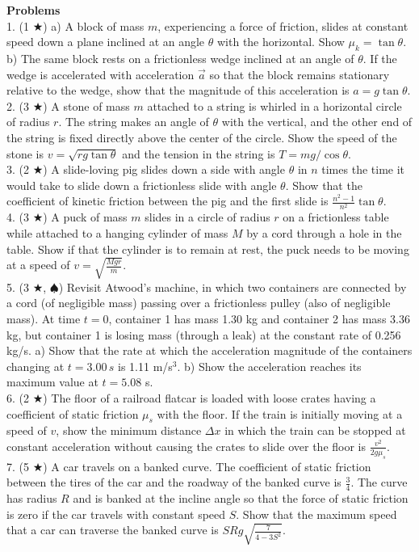 \noindent \textbf{Problems}\\
1. (1 $\bigstar$) a) A block of mass $m$, experiencing a force of friction, slides at constant speed down a plane inclined at an angle $\theta$ with the horizontal. Show $\mu_k = \tan\theta$. b) The same block rests on a frictionless wedge inclined at an angle of $\theta$. If the wedge is accelerated with acceleration $\vec a$ so that the block remains stationary relative to the wedge, show that the magnitude of this acceleration is $a = g\tan \theta$. \\
2. (3 $\bigstar$) A stone of mass $m$ attached to a string is whirled in a horizontal circle of radius $r$. The string makes an angle of $\theta$ with the vertical, and the other end of the string is fixed directly above the center of the circle. Show the speed of the stone is $v = \sqrt{rg\tan\theta}$ and the tension in the string is $T = mg/\cos\theta $.\\
3. (2 $\bigstar$) A slide-loving pig slides down a side with angle $\theta$ in $n$ times the time it would take to slide down a frictionless slide with angle $\theta$. Show that the coefficient of kinetic friction between the pig and the first slide is $\frac{n^2-1}{n^2}\tan\theta$.\\
4. (3 $\bigstar$) A puck of mass $m$ slides in a circle of radius $r$ on a frictionless table while attached to a hanging cylinder of mass $M$ by a cord through a hole in the table. Show if that the cylinder is to remain at rest, the puck needs to be moving at a speed of $v = \sqrt{\frac{Mgr}{m}}$. \\
5. (3 $\bigstar$, $\spadesuit$) Revisit Atwood's machine, in which two containers are connected by a cord (of negligible mass) passing over a frictionless pulley (also of negligible mass). At time $t = 0$, container 1 has mass 1.30 kg and container 2 has mass 3.36 kg, but container 1 is losing mass (through a leak) at the constant rate of 0.256 kg/s. a) Show that the rate at which the acceleration magnitude of the containers changing at $t = 3.00 \, s$ is 1.11 m/s$^3$. b) Show the acceleration reaches its maximum value at $t = 5.08$ s.\\
6. (2 $\bigstar$) The floor of a railroad flatcar is loaded with loose crates having a coefficient of static friction $\mu_s$ with the floor. If the train is initially moving at a speed of $v$, show the minimum distance $\Delta x$ in which the train can be stopped at constant acceleration without causing the crates to slide over the floor is $\frac{v^2}{2g\mu_s}$.\\
7. (5 $\bigstar$) A car travels on a banked curve. The coefficient of static friction between the tires of the car and the roadway of the banked curve is $\frac{3}{4}$. The curve has radius $R$ and is banked at the incline angle so that the force of static friction is zero if the car travels with constant speed $S$. Show that the maximum speed that a car can traverse the banked curve is $SRg \sqrt{\frac{7}{4-3S^2}}$. 

\pagebreak